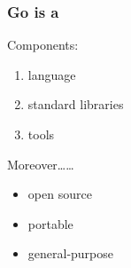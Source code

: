 \begin{frame}[t]
  \frametitle{Go is a }

  Components:

  \begin{enumerate}
  \item language
  \item standard libraries
  \item tools
  \end{enumerate}

  \vspace{\baselineskip}

  Moreover\dots\dots
  \begin{itemize}
  \item open source
  \item portable
  \item general-purpose
  \end{itemize}


\end{frame}
